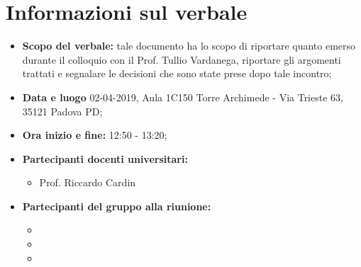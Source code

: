 \clearpage
\section{Informazioni sul verbale}
\label{sec:informazioni}
\begin{itemize}
	\item \textbf {Scopo del verbale:} tale documento ha lo scopo di riportare quanto emerso durante il colloquio con il Prof. Tullio Vardanega, riportare gli argomenti trattati e segnalare le decisioni che sono state prese dopo tale incontro;
	\item \textbf {Data e luogo} 02-04-2019, Aula 1C150 Torre Archimede - Via Trieste 63, 35121 Padova PD;
	\item \textbf {Ora inizio e fine:} 12:50 - 13:20;
	\item \textbf {Partecipanti docenti universitari:} 
		\begin{itemize}
			\item Prof. Riccardo Cardin
		\end{itemize}
	\item \textbf {Partecipanti del gruppo alla riunione:} 
		 \begin{itemize}
			\item \sonia
			\item \alessandro
			\item \andrea
		\end{itemize}
\end{itemize}